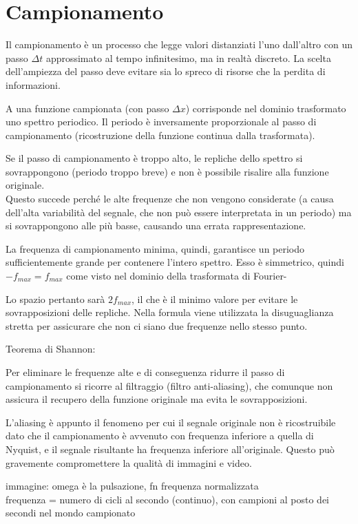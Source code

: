 \section{Campionamento}
Il campionamento è un processo che legge valori distanziati l'uno dall'altro con un passo $\Delta t$ approssimato al tempo infinitesimo, ma in realtà discreto. La scelta dell'ampiezza del passo deve evitare sia lo spreco di risorse che la perdita di informazioni.

A una funzione campionata (con passo $\Delta x$) corrisponde nel dominio trasformato uno spettro periodico. Il periodo è inversamente proporzionale al passo di campionamento (ricostruzione della funzione continua dalla trasformata).

Se il passo di campionamento è troppo alto, le repliche dello spettro si sovrappongono (periodo troppo breve) e non è possibile risalire alla funzione originale. \\
Questo succede perché le alte frequenze che non vengono considerate (a causa dell'alta variabilità del segnale, che non può essere interpretata in un periodo) ma si sovrappongono alle più basse, causando una errata rappresentazione.

La frequenza di campionamento minima, quindi, garantisce un periodo sufficientemente grande per contenere l'intero spettro. Esso è simmetrico, quindi $-f_{max} = f_{max}$ come visto nel dominio della trasformata di Fourier-

Lo spazio pertanto sarà $2f_{max}$, il che è il minimo valore per evitare le sovrapposizioni delle repliche. Nella formula viene utilizzata la disuguaglianza stretta per assicurare che non ci siano due frequenze nello stesso punto.

Teorema di Shannon:

Per eliminare le frequenze alte e di conseguenza ridurre il passo di campionamento si ricorre al filtraggio (filtro anti-aliasing), che comunque non assicura il recupero della funzione originale ma evita le sovrapposizioni.

L'aliasing è appunto il fenomeno per cui il segnale originale non è ricostruibile dato che il campionamento è avvenuto con frequenza inferiore a quella di Nyquist, e il segnale risultante ha frequenza inferiore all'originale. Questo può gravemente compromettere la qualità di immagini e video.

immagine: omega è la pulsazione, fn frequenza normalizzata \\
frequenza = numero di cicli al secondo (continuo), con campioni al posto dei secondi nel mondo campionato \\

